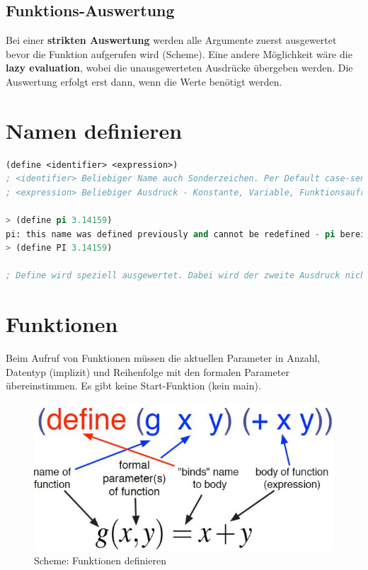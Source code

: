 \subsection{Funktions-Auswertung}
Bei einer \textbf{strikten Auswertung} werden alle Argumente zuerst ausgewertet bevor die Funktion aufgerufen wird (Scheme). Eine andere Möglichkeit wäre die \textbf{lazy evaluation}, wobei die unausgewerteten Ausdrücke übergeben werden. Die Auswertung erfolgt erst dann, wenn die Werte benötigt werden.

\newpage
\section{Namen definieren}
\begin{lstlisting}[language=Lisp, caption=Namen definieren]
(define <identifier> <expression>)
; <identifier> Beliebiger Name auch Sonderzeichen. Per Default case-sensitive, in DrRacket ausschaltbar.
; <expression> Beliebiger Ausdruck - Konstante, Variable, Funktionsaufruf, ...

> (define pi 3.14159)
pi: this name was defined previously and cannot be redefined - pi bereits eine Scheme Konstante
> (define PI 3.14159)

; Define wird speziell ausgewertet. Dabei wird der zweite Ausdruck nicht ausgewertet (im Beispiel pi). Zudem ist der Rückgabewerte von define nicht spezifiziert.
\end{lstlisting}

\section{Funktionen}
Beim Aufruf von Funktionen müssen die aktuellen Parameter in Anzahl, Datentyp (implizit) und Reihenfolge mit den formalen Parameter übereinstimmen. Es gibt keine Start-Funktion (kein main).

\begin{figure}[h!]
\centering
\includegraphics[width=0.5\linewidth]{fig/scheme-function-definition}
\caption{Scheme: Funktionen definieren}
\label{fig:scheme-function-definition}
\end{figure}

